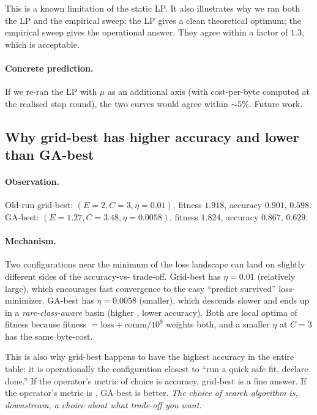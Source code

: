 This is a known limitation of the static LP. It also illustrates why we ran
both the LP and the empirical sweep: the LP gives a clean theoretical optimum;
the empirical sweep gives the operational answer. They agree within a factor
of $1.3$, which is acceptable.

\paragraph{Concrete prediction.} If we re-ran the LP with $\mu$ as an
additional axis (with cost-per-byte computed at the realised stop round), the
two curves would agree within $\sim$$5\%$. Future work.

\subsection{Why grid-best has higher accuracy and lower \auprc{} than GA-best}
\label{sec:mechanism-grid-vs-ga}

\paragraph{Observation.} Old-run grid-best:
$(E\!=\!2, C\!=\!3, \eta\!=\!0.01)$, fitness $1.918$, accuracy $0.901$,
\auprc{} $0.598$. GA-best: $(E\!=\!1.27, C\!=\!3.48, \eta\!=\!0.0058)$,
fitness $1.824$, accuracy $0.867$, \auprc{} $0.629$.

\paragraph{Mechanism.} Two configurations near the minimum of the loss
landscape can land on slightly different sides of the accuracy-vs-\auprc{}
trade-off. Grid-best has $\eta\!=\!0.01$ (relatively large), which encourages
fast convergence to the easy ``predict survived'' loss-minimizer. GA-best has
$\eta\!=\!0.0058$ (smaller), which descends slower and ends up in a
\emph{rare-class-aware} basin (higher \auprc{}, lower accuracy). Both are
local optima of fitness because fitness $= \mathrm{loss} + \mathrm{comm}/10^9$
weights both, and a smaller $\eta$ at $C\!=\!3$ has the same byte-cost.

This is also why grid-best happens to have the highest accuracy in the entire
table: it is operationally the configuration closest to ``run a quick safe
fit, declare done.'' If the operator's metric of choice is accuracy,
grid-best is a fine answer. If the operator's metric is \auprc{}, GA-best
is better. \emph{The choice of search algorithm is, downstream, a choice
about what trade-off you want.}

